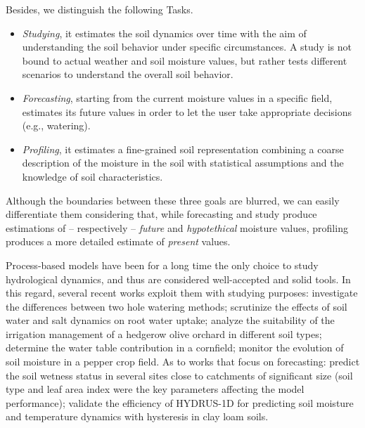 Besides, we distinguish the following Tasks.
\begin{itemize}
    \item \emph{Studying}, it estimates the soil dynamics over time with the aim of understanding the soil behavior under specific circumstances. A study is not bound to actual weather and soil moisture values, but rather tests different scenarios to understand the overall soil behavior.
    \item \emph{Forecasting}, starting from the current moisture values in a specific field, estimates its future values in order to let the user take appropriate decisions (e.g., watering).
    \item \emph{Profiling}, it estimates a fine-grained soil representation combining a coarse description of the moisture in the soil with statistical assumptions and the knowledge of soil characteristics.
\end{itemize}
Although the boundaries between these three goals are blurred, we can easily differentiate them considering that, while forecasting and study produce estimations of -- respectively -- \emph{future} and \emph{hypotethical} moisture values, profiling produces a more detailed estimate of \emph{present} values.

Process-based models have been for a long time the only choice to study hydrological dynamics, and thus are considered well-accepted and solid tools.
In this regard, several recent works exploit them with studying purposes: \cite{Pan2021} investigate the differences between two hole watering methods;  \cite{Li20152382} scrutinize the effects of soil water and salt dynamics on root water uptake; \cite{Egea2016197} analyze the suitability of the irrigation management of a hedgerow olive orchard in different soil types; \cite{Cordeiro2016139} determine the water table contribution in a cornfield; \cite{Zapata-Sierra2021} monitor the evolution of soil moisture in a pepper crop field.
As to works that focus on forecasting: \cite{chen2014spatial} predict the soil wetness status in several sites close to catchments of significant size (soil type and leaf area index were the key parameters affecting the model performance); \cite{shein2019validation} validate the efficiency of HYDRUS-1D for predicting soil moisture and temperature dynamics with hysteresis in clay loam soils.

